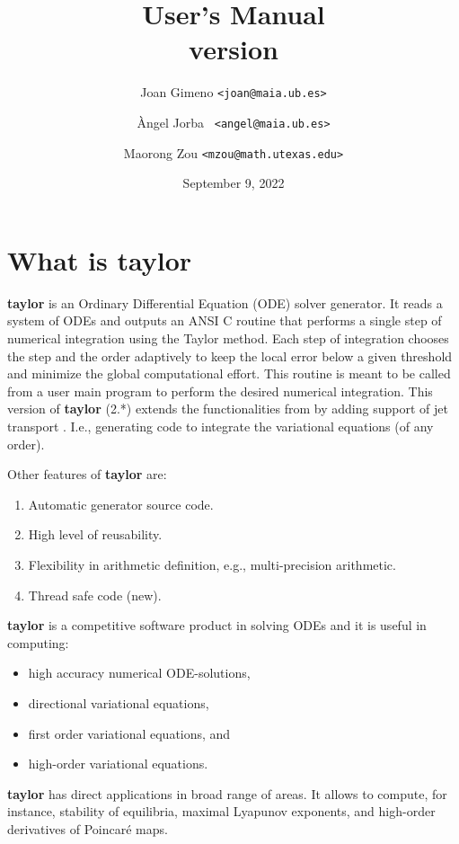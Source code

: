 \documentclass[10pt]{article}
\title{\taylorname{} User's Manual\\[.5em] \normalsize version \version{}}
\author{Joan Gimeno {\tt <joan@maia.ub.es>} \and \`Angel Jorba {\tt
    <angel@maia.ub.es>} \and Maorong Zou {\tt <mzou@math.utexas.edu>}}
\date{September 9, 2022}
\theoremstyle{remark}
\newcommand{\taylorname}{{\bf taylor}}
\begin{document}
\maketitle

\vspace{-2em}\tableofcontents \newpage %

\section{What is \taylorname{}} \label{sec:whatis}
\taylorname{} is an Ordinary Differential Equation (ODE) solver
generator.  It reads a system of ODEs and outputs an ANSI C routine
that performs a single step of numerical integration using the Taylor
method. Each step of integration chooses the step and the order
adaptively to keep the local error below a given threshold and
minimize the global computational effort.  This routine is meant to be
called from a user main program to perform the desired numerical
integration. This version of \taylorname{} (2.*) extends the
functionalities from \cite{JZ} by adding support of jet transport
\cite{GJJMZ}. I.e., generating code to integrate the variational
equations (of any order).

\smallskip 

Other features of \taylorname{} are:
\begin{enumerate}
\renewcommand{\theenumi}{\roman{enumi}}
    \item Automatic generator source code.
    \item High level of reusability.
    \item Flexibility in arithmetic definition, e.g.,
      multi-precision arithmetic.
    \item Thread safe code ({\sc new}).
\end{enumerate}
\taylorname{} is a competitive software product in solving ODEs and it
is useful in computing:
\begin{itemize}
    \item high accuracy numerical ODE-solutions,
    \item directional variational equations,
    \item first order variational equations, and
    \item high-order variational equations.
\end{itemize}
\taylorname{} has direct applications in broad range of areas.  It
allows to compute, for instance, stability of equilibria, maximal
Lyapunov exponents, and high-order derivatives of Poincar\'e maps.
\end{document}
